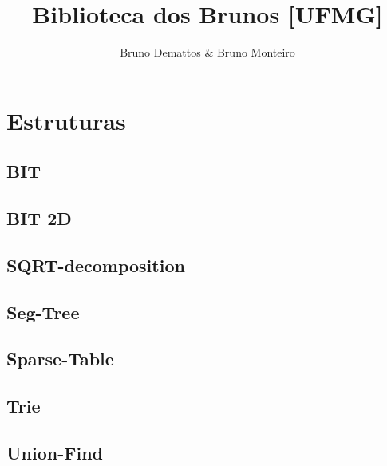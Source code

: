 \documentclass[12pt]{article}
\title{Biblioteca dos Brunos [UFMG]}
\author{Bruno Demattos \& Bruno Monteiro}
\begin{document}
\twocolumn
\date{} %
\maketitle


\renewcommand{\contentsname}{Índice} %
\tableofcontents





%
%

\section{Estruturas}

\subsection{BIT}


\subsection{BIT 2D}


\subsection{SQRT-decomposition}


\subsection{Seg-Tree}


\subsection{Sparse-Table}


\subsection{Trie}


\subsection{Union-Find}

\end{document}
